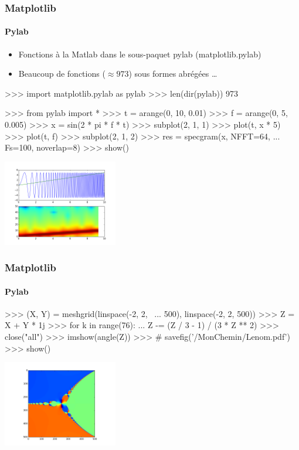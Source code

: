 \begin{frame}[fragile]
\frametitle{Matplotlib}
\framesubtitle{Pylab}
\begin{itemize}
 \item Fonctions à la Matlab dans le sous-paquet pylab (matplotlib.pylab)
 \item Beaucoup de fonctions ($\approx 973$) sous formes abrégées \dots
\end{itemize}
\begin{minipage}[c]{5cm}
\begin{pythonConsole}
>>> import matplotlib.pylab as pylab
>>> len(dir(pylab))
973

>>> from pylab import *
>>> t = arange(0, 10, 0.01)
>>> f = arange(0, 5, 0.005)
>>> x = sin(2 * pi * f * t)
>>> subplot(2, 1, 1)
>>> plot(t, x * 5)
>>> plot(t, f)
>>> subplot(2, 1, 2)
>>> res = specgram(x, NFFT=64, 
... Fs=100, noverlap=8)
>>> show()
\end{pythonConsole}
\end{minipage}
\begin{minipage}[c]{5cm}
 \includegraphics[width=5cm]{./fig/specgram.png}
\end{minipage}
\end{frame}
\begin{frame}[fragile]
\frametitle{Matplotlib}
\framesubtitle{Pylab}
\begin{minipage}{5cm}
\begin{pythonConsole}
>>> (X, Y) = meshgrid(linspace(-2, 2, \
... 500), linspace(-2, 2, 500))
>>> Z = X + Y * 1j
>>> for k in range(76): 
...  Z -= (Z / 3 - 1) / (3 * Z ** 2)
>>> close("all")	
>>> imshow(angle(Z))
>>> # savefig('/MonChemin/Lenom.pdf')
>>> show()
\end{pythonConsole}
\end{minipage}
\begin{minipage}{5cm}
\includegraphics[width=5cm]{fig/fractal.png}
\end{minipage}
\end{frame}
